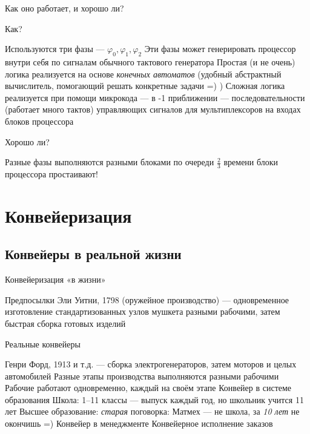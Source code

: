 \documentclass[xetex,aspectratio=43]{beamer}
\begin{document}
\begin{frame}{Как оно работает, и хорошо ли?}
    \begin{block}{Как?}
        \begin{outline}[itemize]
        \1 Используются три фазы --- $\varphi_0, \varphi_1, \varphi_2$
            \2 Эти фазы может генерировать процессор внутри себя по сигналам обычного тактового генератора
        \1 Простая (и не очень) логика реализуется на основе \emph{конечных автоматов} (удобный абстрактный вычислитель, помогающий решать конкретные задачи =) )
        \1 Сложная логика реализуется при помощи микрокода --- в -1 приближении --- последовательности (работает много тактов) управляющих сигналов для мультиплексоров на входах блоков процессора
    \end{outline}
    \end{block}

    \pause
    \begin{block}{Хорошо ли?}
    \begin{outline}[itemize]
        \1 Разные фазы выполняются разными блоками по очереди
            \2 $\frac{2}{3}$ времени блоки процессора простаивают!
    \end{outline}
    \end{block}
\end{frame}

\section{Конвейеризация}

\subsection{Конвейеры в реальной жизни}

\begin{frame}{Конвейеризация «в жизни»}
\begin{block}{Предпосылки}
    Эли Уитни, 1798 (оружейное производство) — одновременное изготовление стандартизованных узлов мушкета разными рабочими, затем быстрая сборка готовых изделий
\end{block}

\begin{block}{Реальные конвейеры}
    \begin{outline}[itemize]
        \1 Генри Форд, 1913 и т.д. — сборка электрогенераторов, затем моторов и целых автомобилей
            \2 Разные этапы производства выполняются разными рабочими
            \2 Рабочие работают одновременно, каждый на своём этапе
        \1 Конвейер в системе образования
            \2 Школа: 1–11 классы — выпуск каждый год, но школьник учится 11 лет
            \2 Высшее образование: \emph{старая} поговорка: Матмех — не школа, за \emph{10 лет} не окончишь =)
        \1 Конвейер в менеджменте
            \2 Конвейерное исполнение заказов
    \end{outline}
\end{block}
\end{frame}
\end{document}
